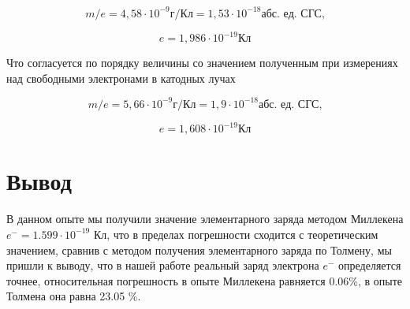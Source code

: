 \documentclass{lab}
\begin{document}
\begin{equation}
    m/e = 4,58 \cdot 10^{-9} \text{г/Кл} = 1,53 \cdot 10^{-18} \text{абс. ед. СГС,}
\end{equation}

\begin{equation}
    e = 1,986\cdot 10^{-19} \text{Кл}
\end{equation}

Что согласуется по порядку величины со значением полученным при измерениях над свободными электронами в катодных лучах

\begin{equation}
    m/e = 5,66 \cdot 10^{-9} \text{г/Кл}  = 1,9 \cdot 10^{-18} \text{абс. ед. СГС,}
\end{equation}

\begin{equation}
    e = 1,608\cdot 10^{-19} \text{Кл}
\end{equation}

\section{Вывод}
В данном опыте мы получили значение элементарного заряда методом Миллекена $e^{-} = 1.599 \cdot10^{-19} \text{ Кл}$, что в пределах погрешности сходится с теоретическим значением, сравнив с методом получения элементарного заряда по Толмену, мы пришли к выводу, что в нашей работе реальный заряд электрона $e^{-}$ определяется точнее, относительная погрешность в опыте Миллекена равняется 0.06\%, в опыте Толмена она равна 23.05 \%.
\end{document}
